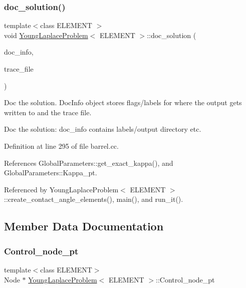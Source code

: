 \subsubsection{\texorpdfstring{doc\+\_\+solution()}{doc\_solution()}\hspace{0.1cm}{\footnotesize\ttfamily [2/2]}}
{\footnotesize\ttfamily template$<$class E\+L\+E\+M\+E\+NT $>$ \\
void \hyperlink{classYoungLaplaceProblem}{Young\+Laplace\+Problem}$<$ E\+L\+E\+M\+E\+NT $>$\+::doc\+\_\+solution (\begin{DoxyParamCaption}\item[{Doc\+Info \&}]{doc\+\_\+info,  }\item[{ofstream \&}]{trace\+\_\+file }\end{DoxyParamCaption})}



Doc the solution. Doc\+Info object stores flags/labels for where the output gets written to and the trace file. 

Doc the solution\+: doc\+\_\+info contains labels/output directory etc. 

Definition at line 295 of file barrel.\+cc.



References Global\+Parameters\+::get\+\_\+exact\+\_\+kappa(), and Global\+Parameters\+::\+Kappa\+\_\+pt.



Referenced by Young\+Laplace\+Problem$<$ E\+L\+E\+M\+E\+N\+T $>$\+::create\+\_\+contact\+\_\+angle\+\_\+elements(), main(), and run\+\_\+it().



\subsection{Member Data Documentation}
\mbox{\label{classYoungLaplaceProblem_a1d659f1b2d73140a5d52889f9581d12f}} 
\subsubsection{\texorpdfstring{Control\+\_\+node\+\_\+pt}{Control\_node\_pt}}
{\footnotesize\ttfamily template$<$class E\+L\+E\+M\+E\+NT$>$ \\
Node $\ast$ \hyperlink{classYoungLaplaceProblem}{Young\+Laplace\+Problem}$<$ E\+L\+E\+M\+E\+NT $>$\+::Control\+\_\+node\+\_\+pt\hspace{0.3cm}{\ttfamily [private]}}



